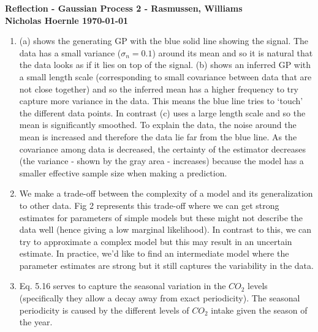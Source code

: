 \documentclass[twoside]{article}
\begin{document}
\textbf{Reflection - Gaussian Process 2 - Rasmussen, Williams}\\
\textbf{Nicholas Hoernle \hfill \today}

\begin{enumerate}
  \item (a) shows the generating GP with the blue solid line showing the signal. The data has a small variance ($\sigma_n=0.1$) around its mean and so it is natural that the data looks as if it lies on top of the signal. (b) shows an inferred GP with a small length scale (corresponding to small covariance between data that are not close together) and so the inferred mean has a higher frequency to try capture more variance in the data. This means the blue line tries to `touch' the different data points. In contrast (c) uses a large length scale and so the mean is significantly smoothed. To explain the data, the noise around the mean is increased and therefore the data lie far from the blue line. As the covariance among data is decreased, the certainty of the estimator decreases (the variance - shown by the gray area - increases) because the model has a smaller effective sample size when making a prediction.
  \item We make a trade-off between the complexity of a model and its generalization to other data. Fig 2 represents this trade-off where we can get strong estimates for parameters of simple models but these might not describe the data well (hence giving a low marginal likelihood). In contrast to this, we can try to approximate a complex model but this may result in an uncertain estimate. In practice, we'd like to find an intermediate model where the parameter estimates are strong but it still captures the variability in the data.
  \item Eq. 5.16 serves to capture the seasonal variation in the $CO_2$ levels (specifically they allow a decay away from exact periodicity). The seasonal periodicity is caused by the different levels of $CO_2$ intake given the season of the year.
\end{enumerate}
% 
\end{document}
